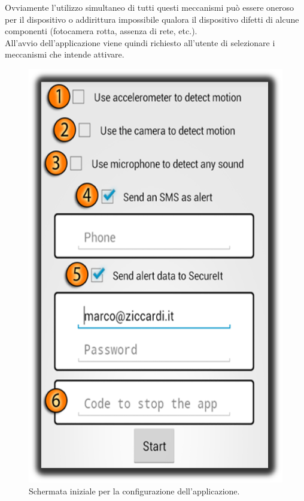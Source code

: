 Ovviamente l'utilizzo simultaneo di tutti questi meccanismi può essere oneroso per il dispositivo o addirittura impossibile qualora il dispositivo difetti di alcune componenti (fotocamera rotta, assenza di rete, etc.).\\
All'avvio dell'applicazione viene quindi richiesto all'utente di selezionare i meccanismi che intende attivare. 
\begin{figure}[!ht]
\begin{center}
\includegraphics[scale=.3]{./../wireless/resources/config.png}
\caption{Schermata iniziale per la configurazione dell'applicazione.}
\label{fig:SchermataIniziale}
\end{center}
\end{figure}

